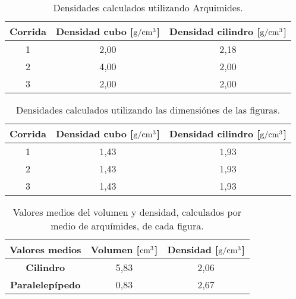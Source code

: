 \documentclass[12pt,letterpaper]{article}
\begin{document}
\begin{table}[H]
\begin{center}

\begin{tabular}{|c|c|c|}
\hline 
\textbf{Corrida} & \textbf{Densidad cubo} [$\textup{g} / \textup{cm}^{3}$] & \textbf{Densidad cilindro} [$\textup{g} / \textup{cm}^{3}$] \\ 
\hline 
1 & 2,00 & 2,18 \\ 
\hline 
2 & 4,00 & 2,00 \\ 
\hline 
3 & 2,00 & 2,00 \\ 
\hline 
\end{tabular} 

\caption{Densidades calculados utilizando Arquimides.}

\label{Tab:den_arq}
\end{center}
\end{table}





\begin{table}[H]
\begin{center}

\begin{tabular}{|c|c|c|}
\hline 
\textbf{Corrida} & \textbf{Densidad cubo} [$\textup{g} / \textup{cm}^{3}$] & \textbf{Densidad cilindro} [$\textup{g} / \textup{cm}^{3}$] \\ 
\hline 
1 & 1,43 & 1,93 \\ 
\hline 
2 & 1,43 & 1,93  \\ 
\hline 
3 & 1,43 & 1,93  \\ 
\hline 
\end{tabular} 

\caption{Densidades calculados utilizando las dimensiónes de las figuras.}

\label{Tab:den_medidas}
\end{center}
\end{table}




\begin{table}[H]
\begin{center}

\begin{tabular}{|c|c|c|}
\hline 
\textbf{Valores medios} & \textbf{Volumen} [$\textup{cm}^{3}$]& \textbf{Densidad} [$\textup{g} / \textup{cm}^{3}$]\\ 
\hline 
\textbf{Cilindro} & 5,83 & 2,06 \\ 
\hline 
\textbf{Paralelepípedo} & 0,83 & 2,67 \\ 
\hline 
\end{tabular} 

\caption{Valores medios del volumen y densidad, calculados por medio de arquímides, de cada figura.}

\label{Tab:Media}
\end{center}
\end{table}
\end{document}
